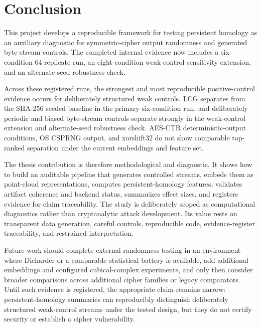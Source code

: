 
\section{Conclusion}
\label{sec:conclusion}

This project develops a reproducible framework for testing persistent homology as an auxiliary diagnostic for symmetric-cipher output randomness and generated byte-stream controls. The completed internal evidence now includes a six-condition 64-replicate run, an eight-condition weak-control sensitivity extension, and an alternate-seed robustness check.

Across these registered runs, the strongest and most reproducible positive-control evidence occurs for deliberately structured weak controls. LCG separates from the SHA-256 seeded baseline in the primary six-condition run, and deliberately periodic and biased byte-stream controls separate strongly in the weak-control extension and alternate-seed robustness check. AES-CTR deterministic-output conditions, OS CSPRNG output, and xorshift32 do not show comparable top-ranked separation under the current embeddings and feature set.

The thesis contribution is therefore methodological and diagnostic. It shows how to build an auditable pipeline that generates controlled streams, embeds them as point-cloud representations, computes persistent-homology features, validates artifact coherence and backend status, summarizes effect sizes, and registers evidence for claim traceability. The study is deliberately scoped as computational diagnostics rather than cryptanalytic attack development. Its value rests on transparent data generation, careful controls, reproducible code, evidence-register traceability, and restrained interpretation.

Future work should complete external randomness testing in an environment where Dieharder or a comparable statistical battery is available, add additional embeddings and configured cubical-complex experiments, and only then consider broader comparisons across additional cipher families or legacy comparators. Until such evidence is registered, the appropriate claim remains narrow: persistent-homology summaries can reproducibly distinguish deliberately structured weak-control streams under the tested design, but they do not certify security or establish a cipher vulnerability.
